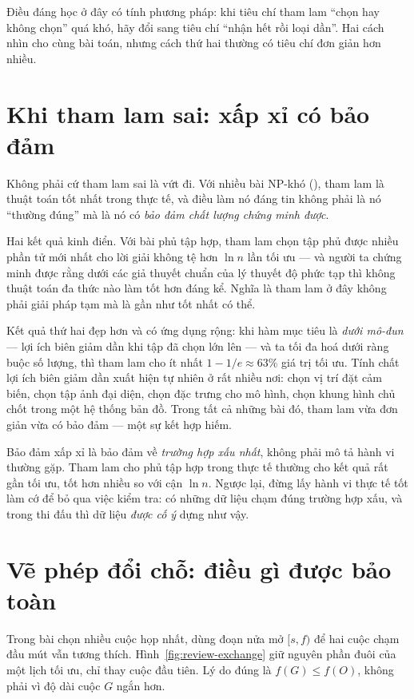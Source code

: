\documentclass[../../algorithm.tex]{subfiles}
\begin{document}
Điều đáng học ở đây có tính phương pháp: khi tiêu chí tham lam ``chọn hay không chọn'' quá khó, hãy đổi sang tiêu chí ``nhận hết rồi loại dần''. Hai cách nhìn cho cùng bài toán, nhưng cách thứ hai thường có tiêu chí đơn giản hơn nhiều.

\section{Khi tham lam sai: xấp xỉ có bảo đảm}

Không phải cứ tham lam sai là vứt đi. Với nhiều bài NP-khó (), tham lam là thuật toán tốt nhất trong thực tế, và điều làm nó đáng tin không phải là nó ``thường đúng'' mà là nó có \emph{bảo đảm chất lượng chứng minh được}.

Hai kết quả kinh điển. Với bài phủ tập hợp, tham lam chọn tập phủ được nhiều phần tử mới nhất cho lời giải không tệ hơn \(\ln n\) lần tối ưu --- và người ta chứng minh được rằng dưới các giả thuyết chuẩn của lý thuyết độ phức tạp thì không thuật toán đa thức nào làm tốt hơn đáng kể. Nghĩa là tham lam ở đây không phải giải pháp tạm mà là gần như tốt nhất có thể.

Kết quả thứ hai đẹp hơn và có ứng dụng rộng: khi hàm mục tiêu là \emph{dưới mô-đun} --- lợi ích biên giảm dần khi tập đã chọn lớn lên --- và ta tối đa hoá dưới ràng buộc số lượng, thì tham lam cho ít nhất \(1 - 1/e \approx 63\%\) giá trị tối ưu. Tính chất lợi ích biên giảm dần xuất hiện tự nhiên ở rất nhiều nơi: chọn vị trí đặt cảm biến, chọn tập ảnh đại diện, chọn đặc trưng cho mô hình, chọn khung hình chủ chốt trong một hệ thống bản đồ. Trong tất cả những bài đó, tham lam vừa đơn giản vừa có bảo đảm --- một sự kết hợp hiếm.

\begin{cambay}
Bảo đảm xấp xỉ là bảo đảm về \emph{trường hợp xấu nhất}, không phải mô tả hành vi thường gặp. Tham lam cho phủ tập hợp trong thực tế thường cho kết quả rất gần tối ưu, tốt hơn nhiều so với cận \(\ln n\). Ngược lại, đừng lấy hành vi thực tế tốt làm cớ để bỏ qua việc kiểm tra: có những dữ liệu chạm đúng trường hợp xấu, và trong thi đấu thì dữ liệu \emph{được cố ý} dựng như vậy.
\end{cambay}


\section{Vẽ phép đổi chỗ: điều gì được bảo toàn}

Trong bài chọn nhiều cuộc họp nhất, dùng đoạn nửa mở \([s,f)\) để hai cuộc chạm đầu mút vẫn tương thích.
Hình~\ref{fig:review-exchange} giữ nguyên phần đuôi của một lịch tối ưu, chỉ thay cuộc đầu tiên.
Lý do đúng là \(f(G)\le f(O)\), không phải vì độ dài cuộc \(G\) ngắn hơn.
\end{document}
